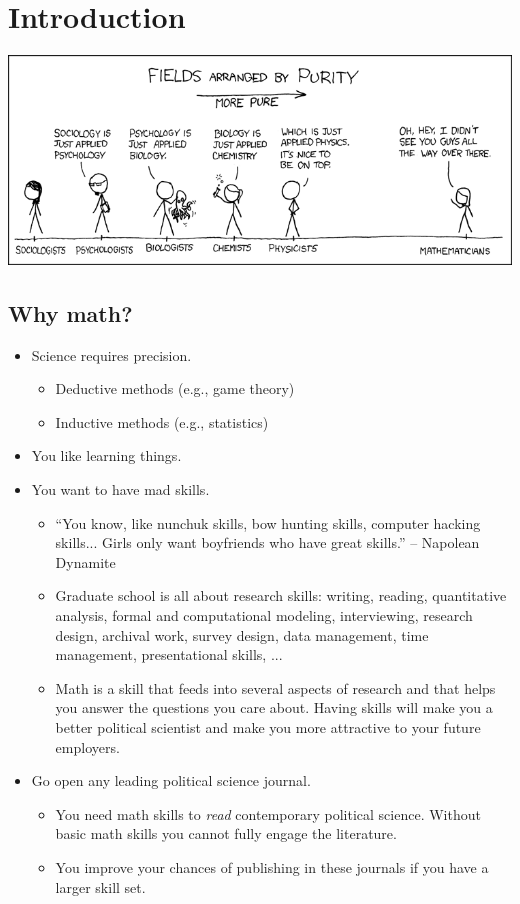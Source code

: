 \documentclass[20pt]{extarticle}
\newcommand{\bi}{\begin{itemize}}
\newcommand{\ei}{\end{itemize}}
\begin{document}
\section{Introduction}
\begin{center}
\includegraphics[width=6in]{purity}
\end{center}
\subsection{Why math?}
\bi
\item Science requires precision.
\bi
\item Deductive methods (e.g., game theory)
\item Inductive methods (e.g., statistics)
\ei
\item You like learning things.
\item You want to have mad skills.
\bi
\item  ``You know, like nunchuk skills, bow hunting skills, computer
  hacking skills... Girls only want boyfriends who have great
  skills.''  -- Napolean Dynamite
\item Graduate school is all about research skills: writing, reading, quantitative analysis, formal and computational modeling, interviewing, research design, archival work, survey design, data management, time management, presentational skills, ...
\item Math is a skill that feeds into several aspects of research and that helps you answer the
  questions you care about.  Having skills will make you a better
  political scientist and make you more attractive to your future
  employers.  
\ei
\item Go open any leading political science journal.
\bi
\item You need math skills to \textit{read} contemporary political
  science.  Without basic math skills you cannot fully engage the
  literature.  
\item You improve your chances of publishing in these journals if you
  have a larger skill set.
\ei
\ei
\end{document}
